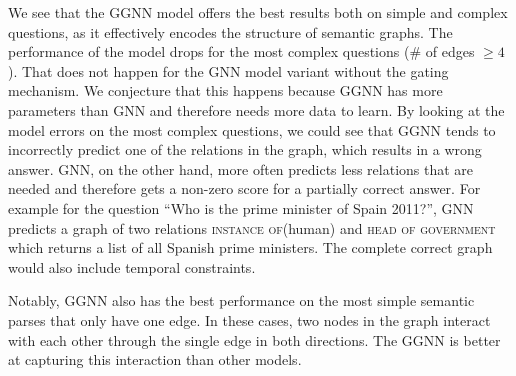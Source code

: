 \documentclass[11pt]{article}
\begin{document}
We see that the GGNN model offers the best results both on simple and complex questions, as it effectively encodes the structure of semantic graphs. The performance of the model drops for the most complex questions (\# of edges $\geq 4$). That does not happen for the GNN model variant without the gating mechanism. We conjecture that this happens because GGNN has more parameters than GNN and therefore needs more data to learn. By looking at the model errors on the most complex questions, we could see that GGNN tends to incorrectly predict one of the relations in the graph, which results in a wrong answer. GNN, on the other hand, more often predicts less relations that are needed and therefore gets a non-zero score for a partially correct answer. For example for the question ``Who is the prime minister of Spain 2011?'', GNN predicts a graph of two relations \textsc{instance of}\hspace{0.1em}({\small\sffamily human}) and \textsc{head of government} which returns a list of all Spanish prime ministers. The complete correct graph would also include temporal constraints.


Notably, GGNN also has the best performance on the most simple semantic parses that only have one edge. In these cases, two nodes in the graph interact with each other through the single edge in both directions. The GGNN is better at capturing this interaction than other models.
\end{document}
